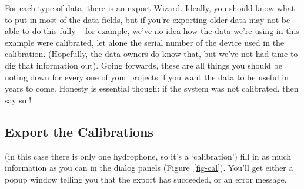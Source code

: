 \documentclass[
]{article}
\begin{document}
For each type of data, there is an export Wizard. Ideally, you should
know what to put in most of the data fields, but if you're exporting
older data may not be able to do this fully -- for example, we've no
idea how the data we're using in this example were calibrated, let alone
the serial number of the device used in the calibration. (Hopefully, the
data owners do know that, but we've not had time to dig that information
out). Going forwards, these are all things you should be noting down for
every one of your projects if you want the data to be useful in years to
come. Honesty is essential though: if the system was not calibrated,
then say so !

\subsection{Export the Calibrations}\label{export-the-calibrations}

(in this case there is only one hydrophone, so it's a `calibration')
fill in as much information as you can in the dialog panels
(Figure~\ref{fig-cal}). You'll get either a popup window telling you
that the export has succeeded, or an error message.
\end{document}
